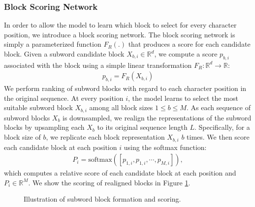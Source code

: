 \documentclass{article} \usepackage{iclr2022_conference,times}
\newcommand{\softmax}{\mathrm{softmax}}
\begin{document}
\subsubsection{Block Scoring Network}
In order to allow the model to learn which block to select for every character position, we introduce a block scoring network. The block scoring network is simply a parameterized function $F_{R}(.)$ that produces a score for each candidate block. Given a subword candidate block $X_{b,i}  \in \mathbb{R}^d$, we compute a score $p_{b,i}$ associated with the block using a simple linear transformation $F_{R}: \mathbb{R}^{d} \rightarrow \mathbb{R}$:
\begin{align}
p_{b,i} = F_{R}(X_{b,i})
\end{align}
We perform ranking of subword blocks with regard to each character position in the original sequence. At every position $i$, the model learns to select the most suitable subword block $X_{b, i}$ among all block sizes $1 \leq b \leq M$. As each sequence of subword blocks $X_{b}$ is downsampled, we realign the representations of the subword blocks by upsampling each $X_{b}$ to its original sequence length $L$. Specifically, for a block size of $b$, we replicate each block representation $X_{b,i}$ $b$ times. We then score each candidate block at each position $i$ using the softmax function:
\begin{align}
P_{i} = \softmax([p_{1,i}, p_{1,i}, \cdots, p_{M,i}]),
\end{align}
which computes a relative score of each candidate block at each position and $P_i \in \mathbb{R}^{M}$.  We show the scoring of realigned blocks in Figure \ref{fig:subword_blocks}.

\begin{figure}[t]
  \hfill
  \hfill
  \caption{Illustration of subword block formation and scoring.}
  \label{fig:subword_blocks}
\end{figure}
\end{document}
